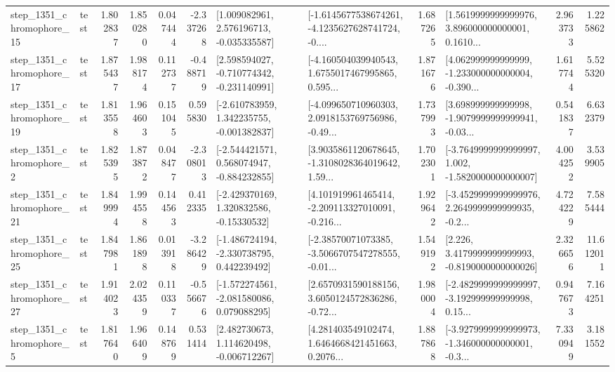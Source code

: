 \begin{tabular}{llrrrrllrlrr}
 step\_1351\_chromophore\_15 &      test &      1.802837 &    1.850280 &      0.047444 & -2.337268 &    [1.009082961, 2.576196713, -0.035335587] &  [-1.6145677538674261, -4.1235627628741724, -0.... &       1.687265 &  [1.5619999999999976, 3.896000000000001, 0.1610... &            2.963733 &          1.225862 \\
 step\_1351\_chromophore\_17 &      test &      1.875437 &    1.988174 &      0.112737 & -0.488719 &   [2.598594027, -0.710774342, -0.231140991] &  [-4.160504039940543, 1.6755017467995865, 0.595... &       1.871676 &  [4.062999999999999, -1.233000000000004, -0.390... &            1.617744 &          5.525320 \\
 step\_1351\_chromophore\_19 &      test &      1.813558 &    1.964603 &      0.151045 &  0.595830 &   [-2.610783959, 1.342235755, -0.001382837] &  [-4.099650710960303, 2.0918153769756986, -0.49... &       1.737993 &  [3.698999999999998, -1.9079999999999941, -0.03... &            0.541837 &          6.632379 \\
  step\_1351\_chromophore\_2 &      test &      1.825395 &    1.873872 &      0.048477 & -2.308013 &   [-2.544421571, 0.568074947, -0.884232855] &  [3.9035861120678645, -1.3108028364019642, 1.59... &       1.702301 &  [-3.7649999999999997, 1.002, -1.5820000000000007] &            4.004252 &          3.539905 \\
 step\_1351\_chromophore\_21 &      test &      1.849994 &    1.994558 &      0.144563 &  0.412335 &    [-2.429370169, 1.320832586, -0.15330532] &  [4.101919961465414, -2.209113327010091, -0.216... &       1.929642 &  [-3.4529999999999976, 2.2649999999999935, -0.2... &            4.724229 &          7.585444 \\
 step\_1351\_chromophore\_25 &      test &      1.847981 &    1.861898 &      0.013918 & -3.286429 &   [-1.486724194, -2.330738795, 0.442239492] &  [-2.38570071073385, -3.5066707547278555, -0.01... &       1.549192 &   [2.226, 3.4179999999999993, -0.8190000000000026] &            2.326656 &         11.612011 \\
 step\_1351\_chromophore\_27 &      test &      1.914023 &    2.024359 &      0.110337 & -0.556676 &   [-1.572274561, -2.081580086, 0.079088295] &  [2.6570931590188156, 3.6050124572836286, -0.72... &       1.980004 &  [-2.4829999999999997, -3.192999999999998, 0.15... &            0.947673 &          7.164251 \\
  step\_1351\_chromophore\_5 &      test &      1.817640 &    1.966409 &      0.148769 &  0.531414 &    [2.482730673, 1.114620498, -0.006712267] &  [4.281403549102474, 1.6464668421451663, 0.2076... &       1.887868 &  [-3.9279999999999973, -1.346000000000001, -0.3... &            7.330949 &          3.181552 \\

\end{tabular}
